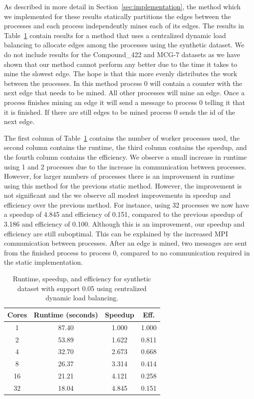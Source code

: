 As described in more detail in Section~\ref{sec:implementation}, the method
which we implemented for these results statically partitions the edges between
the processes and each process independently mines each of its edges. The
results in Table~\ref{tab:synth_dyn} contain results for a method that uses a
centralized dynamic load balancing to allocate edges among the processes
using the synthetic dataset. We do not include results for the
Compound\_422 and MCG-7 datasets as we have shown that our method
cannot perform any better due to the time it takes to mine the slowest edge.
The hope is that this more evenly
distributes the work between the processes. In this method process 0 will
contain a counter with the next edge that needs to be mined. All other
processes will mine an edge. Once a process finishes mining an edge it will
send a message to process 0 telling it that it is finished. If there are still
edges to be mined process 0 sends the id of the next edge.

The first column of
Table~\ref{tab:synth_dyn} contains the number of worker processes used, the
second column contains the runtime, the third column contains the speedup, and
the fourth column contains the efficiency.  We observe a small increase in
runtime using 1 and 2 processes due to the increase in communication between
processes. However, for larger numbers of processes there is an improvement in
runtime using this method for the previous static method. However, the
improvement is not significant and the we observe all modest improvements in
speedup and efficiency over the previous method. For instance, using 32
processes we now have a speedup of 4.845 and efficiency of 0.151, compared to
the previous speedup of 3.186 and efficiency of 0.100. Although this is an
improvement, our speedup and efficiency are still suboptimal. This can be
explained by the increased MPI communication between processes. After an edge
is mined, two messages are sent from the finished process to process 0,
compared to no communication required in the static implementation.


\begin{table}[H]
\centering
\begin{tabular}{cccc}
\hline
Cores & Runtime (seconds) & Speedup &  Eff.  \\
\hline
1   &    87.40   &     1.000  &    1.000   \\ 
2   &    53.89   &     1.622  &    0.811   \\
4   &    32.70   &     2.673  &    0.668   \\
8   &    26.37   &     3.314  &    0.414   \\
16  &    21.21   &     4.121  &    0.258   \\
32  &    18.04   &     4.845  &    0.151   \\
\hline
\end{tabular}
\caption{Runtime, speedup, and efficiency for synthetic dataset with support
         0.05 using centralized dynamic load balancing.}
\label{tab:synth_dyn}
\end{table}

